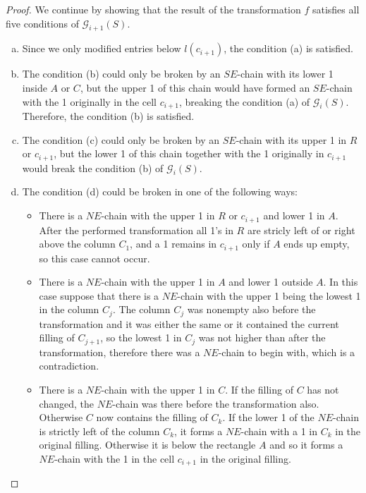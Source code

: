 \begin{proof}
We continue by showing that the result of the transformation $f$ satisfies all five conditions of $\mathcal{G}_{i+1}(S)$.
\begin{enumerate}[(a)]
\item 
Since we only modified entries below $l(c_{i+1})$, the condition (a) is satisfied. 
\item The condition (b) could
only be broken by an $SE$-chain with its lower 1 inside $A$ or $C$, but the upper 1 of this chain would have 
formed an $SE$-chain with the 1 originally in the cell $c_{i+1}$, breaking the condition (a)
of $\mathcal{G}_i(S)$. Therefore, the condition (b) is satisfied. 
\item The condition (c) could only be broken
by an $SE$-chain with its upper 1 in $R$ or $c_{i+1}$, but the lower 1 of this chain together with the 1 originally in $c_{i+1}$
would break the condition (b) of $\mathcal{G}_i(S)$. 
\item The condition (d) could be broken in one of the following ways:
\begin{itemize} 
\item There is a $NE$-chain with the upper 1 in $R$ or $c_{i+1}$ and lower 1 in $A$. After
the performed transformation all 1's in $R$ are stricly left of or right above the column $C_1$, and a 1 remains in $c_{i+1}$
only if $A$ ends up empty, so this case cannot occur. 
\item There is a $NE$-chain with the upper 1 in $A$ and lower 1 outside $A$. In this case suppose that there is a $NE$-chain with
the upper 1 being the lowest 1 in the column $C_j$. The column $C_j$ was nonempty also before the transformation
and it was either the same or it contained the current filling of $C_{j+1}$, so the lowest 1 in $C_j$ was not higher than after the transformation,
therefore there was a $NE$-chain to begin with, which is a contradiction.
\item There is a $NE$-chain with the upper 1 in $C$. If the filling of $C$ has not changed, the $NE$-chain was there before the transformation also.
Otherwise $C$ now contains the filling of $C_k$. If the lower 1 of the $NE$-chain is strictly left of the column $C_k$, it forms
a $NE$-chain with a 1 in $C_k$ in the original filling. Otherwise it is below the rectangle $A$ and so it forms a $NE$-chain with the
1 in the cell $c_{i+1}$ in the original filling.
\end{itemize}


\end{enumerate}
\end{proof}
